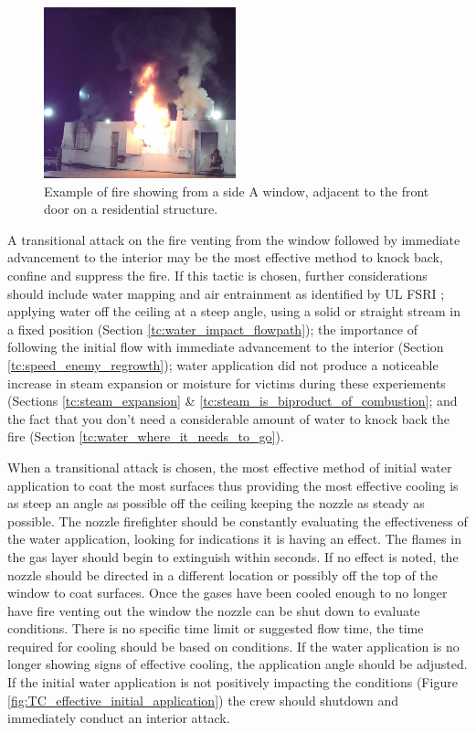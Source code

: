 \documentclass[12pt,oneside]{book}
\begin{document}
\begin{figure}[H]
\centering
\includegraphics[width=0.495\textwidth]{../0_Images/Tactical_Considerations/Transitional_Attack/SIDE_A}
\caption[Example - Fire Showing - Side A]{Example of fire showing from a side A window, adjacent to the front door on a residential structure.}
\label{fig:transitional_attack_TC_fire_showing}
\end{figure}

A transitional attack on the fire venting from the window followed by immediate advancement to the interior may be the most effective method to knock back, confine and suppress the fire. If this tactic is chosen, further considerations should include water mapping and air entrainment as identified by UL FSRI \cite{Weinchenk_watermapping} \cite{Weinchenk_airentrainment}; applying water off the ceiling at a steep angle, using a solid or straight stream in a fixed position (Section \ref{tc:water_impact_flowpath}); the importance of following the initial flow with immediate advancement to the interior (Section \ref{tc:speed_enemy_regrowth}); water application did not produce a noticeable increase in steam expansion or moisture for victims during these experiements (Sections \ref{tc:steam_expansion} \& \ref{tc:steam_is_biproduct_of_combustion}; and the fact that you don't need a considerable amount of water to knock back the fire (Section \ref{tc:water_where_it_needs_to_go}).

When a transitional attack is chosen, the most effective method of initial water application to coat the most surfaces thus providing the most effective cooling is as steep an angle as possible off the ceiling keeping the nozzle as steady as possible. The nozzle firefighter should be constantly evaluating the effectiveness of the water application, looking for indications it is having an effect. The flames in the gas layer should begin to extinguish within seconds. If no effect is noted, the nozzle should be directed in a different location or possibly off the top of the window to coat surfaces. Once the gases have been cooled enough to no longer have fire venting out the window the nozzle can be shut down to evaluate conditions. There is no specific time limit or suggested flow time, the time required for cooling should be based on conditions. If the water application is no longer showing signs of effective cooling, the application angle should be adjusted. If the initial water application is not positively impacting the conditions (Figure \ref{fig:TC_effective_initial_application}) the crew should shutdown and immediately conduct an interior attack.
\end{document}
